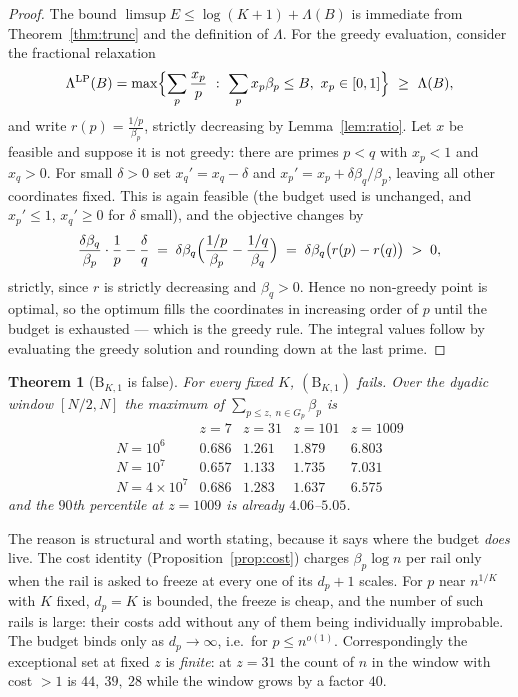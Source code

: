\documentclass[11pt]{article}
\newtheorem{theorem}{Theorem}
\begin{document}
\begin{proof}
The bound $\limsup E\le\log(K+1)+\Lambda(B)$ is immediate from
Theorem~\ref{thm:trunc} and the definition of $\Lambda$.  For the greedy
evaluation, consider the fractional relaxation
\[
  \Lambda^{\mathrm{LP}}(B)=\max\Bigl\{\sum_p\frac{x_p}{p}\ :\
  \sum_px_p\beta_p\le B,\ x_p\in[0,1]\Bigr\}\ \ge\ \Lambda(B),
\]
and write $r(p)=\frac{1/p}{\beta_p}$, strictly decreasing by
Lemma~\ref{lem:ratio}.  Let $x$ be feasible and suppose it is not greedy: there
are primes $p<q$ with $x_p<1$ and $x_q>0$.  For small $\delta>0$ set
$x_q'=x_q-\delta$ and $x_p'=x_p+\delta\beta_q/\beta_p$, leaving all other
coordinates fixed.  This is again feasible (the budget used is unchanged, and
$x_p'\le1$, $x_q'\ge0$ for $\delta$ small), and the objective changes by
\[
  \frac{\delta\beta_q}{\beta_p}\cdot\frac1p-\frac{\delta}{q}
  \;=\;\delta\beta_q\Bigl(\frac{1/p}{\beta_p}-\frac{1/q}{\beta_q}\Bigr)
  \;=\;\delta\beta_q\bigl(r(p)-r(q)\bigr)\;>\;0 ,
\]
strictly, since $r$ is strictly decreasing and $\beta_q>0$.  Hence no
non-greedy point is optimal, so the optimum fills the coordinates in increasing
order of $p$ until the budget is exhausted --- which is the greedy rule.  The
integral values follow by evaluating the greedy solution and rounding down at
the last prime.
\end{proof}

\begin{theorem}[$\mathrm B_{K,1}$ is false]\label{thm:budgetfalse}
For every fixed $K$, $(\mathrm B_{K,1})$ fails.  Over the dyadic window
$[N/2,N]$ the maximum of $\sum_{p\le z,\ n\in G_p}\beta_p$ is
\[
\begin{array}{r|cccc}
 & z=7 & z=31 & z=101 & z=1009\\\hline
 N=10^6    & 0.686 & 1.261 & 1.879 & 6.803\\
 N=10^7    & 0.657 & 1.133 & 1.735 & 7.031\\
 N=4\times10^7 & 0.686 & 1.283 & 1.637 & 6.575
\end{array}
\]
and the $90$th percentile at $z=1009$ is already $4.06$--$5.05$.
\end{theorem}

The reason is structural and worth stating, because it says where the budget
\emph{does} live.  The cost identity (Proposition~\ref{prop:cost}) charges
$\beta_p\log n$ per rail only when the rail is asked to freeze at every one of
its $d_p+1$ scales.  For $p$ near $n^{1/K}$ with $K$ fixed, $d_p=K$ is bounded,
the freeze is cheap, and the number of such rails is large: their costs add
without any of them being individually improbable.  The budget binds only as
$d_p\to\infty$, i.e.\ for $p\le n^{o(1)}$.  Correspondingly the exceptional set
at fixed $z$ is \emph{finite}: at $z=31$ the count of $n$ in the window with
cost $>1$ is $44,\ 39,\ 28$ while the window grows by a factor $40$.
\end{document}
